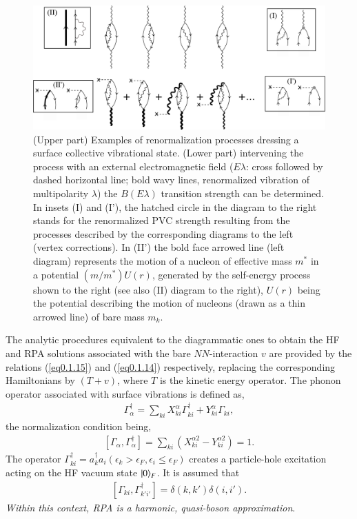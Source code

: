 \begin{figure}
	\centerline {
		\includegraphics*[width=15cm]{introduccion/figs/figpreface9}
	}
	\caption{(Upper part) Examples of renormalization processes dressing a surface collective vibrational state. (Lower part) intervening the process with an external electromagnetic field ($E\lambda$: cross followed by dashed horizontal line; bold wavy lines, renormalized vibration of multipolarity $\lambda$) the $B(E\lambda)$ transition strength can be determined. In insets (I) and (I'), the hatched circle in the diagram to the right stands for the renormalized PVC strength resulting from the processes described by the corresponding diagrams to the left (vertex corrections). In  (II') the bold face arrowed line  (left diagram) represents  the motion of a nucleon of effective mass $m^*$ in a potential $(m/m^*)U(r)$, generated by the self-energy process shown to the right (see also (II)  diagram to the right), $U(r)$  being the potential describing the motion of nucleons (drawn as a thin  arrowed line) of bare mass $m_k$.}
	\label{fig1.0.9}
\end{figure}

The analytic procedures equivalent  to the diagrammatic ones to obtain the HF  and RPA solutions associated with the bare $NN$-interaction $v$ are provided by the relations (\ref{eq0.1.15}) and (\ref{eq0.1.14}) respectively, replacing the corresponding Hamiltonians by $(T+v)$, where $T$ is the kinetic energy operator. The phonon operator associated with surface vibrations is defined as,
\begin{align}\label{eq1.0.26}
\Gamma_\alpha^\dagger=\sum_{ki}X_{ki}^\alpha\Gamma_{ki}^\dagger+Y_{ki}^\alpha\Gamma_{ki},
\end{align}
 the normalization condition being, 
\begin{align}\label{eq1.0.27}
\left[\Gamma_\alpha,\Gamma_\alpha^\dagger\right]=\sum_{ki}\left(X_{ki}^{\alpha2}-Y_{ki}^{\alpha2}\right)=1.
\end{align}
The operator $\Gamma^\dagger_{ki}=a^\dagger_{k}a_{i} (\epsilon_k>\epsilon_F,\epsilon_i\leq\epsilon_F)$ creates a particle-hole excitation acting on the HF vacuum state $|{0} \rangle_F$. It is assumed that
\begin{align}\label{eq1.0.28}
\left[\Gamma_{ki},\Gamma_{k'i'}^\dagger\right]=\delta(k,k')\delta(i,i').
\end{align}
\textit{Within this context, RPA is a harmonic, quasi-boson approximation}.


